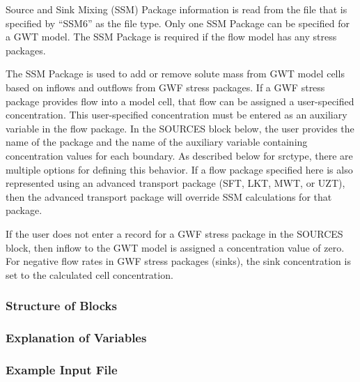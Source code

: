 Source and Sink Mixing (SSM) Package information is read from the file that is specified by ``SSM6'' as the file type.  Only one SSM Package can be specified for a GWT model.  The SSM Package is required if the flow model has any stress packages.

The SSM Package is used to add or remove solute mass from GWT model cells based on inflows and outflows from GWF stress packages.  If a GWF stress package provides flow into a model cell, that flow can be assigned a user-specified concentration.  This user-specified concentration must be entered as an auxiliary variable in the flow package.  In the SOURCES block below, the user provides the name of the package and the name of the auxiliary variable containing concentration values for each boundary.  As described below for srctype, there are multiple options for defining this behavior.  If a flow package specified here is also represented using an advanced transport package (SFT, LKT, MWT, or UZT), then the advanced transport package will override SSM calculations for that package.

If the user does not enter a record for a GWF stress package in the SOURCES block, then inflow to the GWT model is assigned a concentration value of zero.  For negative flow rates in GWF stress packages (sinks), the sink concentration is set to the calculated cell concentration.

\vspace{5mm}
\subsubsection{Structure of Blocks}



\vspace{5mm}
\subsubsection{Explanation of Variables}
\begin{description}

\end{description}

\vspace{5mm}
\subsubsection{Example Input File}


